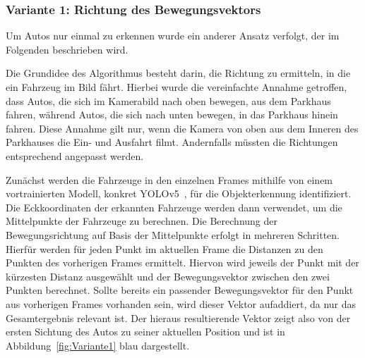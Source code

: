 \subsubsection{Variante 1: Richtung des Bewegungsvektors}\label{ch:Sensor_v1}

Um Autos nur einmal zu erkennen wurde ein anderer Ansatz verfolgt, der im Folgenden beschrieben wird.

Die Grundidee des Algorithmus besteht darin, die Richtung zu ermitteln, in die ein Fahrzeug im Bild fährt.
Hierbei wurde die vereinfachte Annahme getroffen, dass Autos, die sich im Kamerabild nach oben bewegen, aus dem Parkhaus fahren, während Autos, die sich nach unten bewegen, in das Parkhaus hinein fahren.
Diese Annahme gilt nur, wenn die Kamera von oben aus dem Inneren des Parkhauses die Ein- und Ausfahrt filmt.
Andernfalls müssten die Richtungen entsprechend angepasst werden.

Zunächst werden die Fahrzeuge in den einzelnen Frames mithilfe von einem vortrainierten Modell, konkret YOLOv5~\cite{yolov5}, für die Objekterkennung identifiziert.
Die Eckkoordinaten der erkannten Fahrzeuge werden dann verwendet, um die Mittelpunkte der Fahrzeuge zu berechnen.
Die Berechnung der Bewegungsrichtung auf Basis der Mittelpunkte erfolgt in mehreren Schritten.
Hierfür werden für jeden Punkt im aktuellen Frame die Distanzen zu den Punkten des vorherigen Frames ermittelt.
Hiervon wird jeweils der Punkt mit der kürzesten Distanz ausgewählt und der Bewegungsvektor zwischen den zwei Punkten berechnet.
Sollte bereits ein passender Bewegungsvektor für den Punkt aus vorherigen Frames vorhanden sein, wird dieser Vektor aufaddiert, da nur das Gesamtergebnis relevant ist.
Der hieraus resultierende Vektor zeigt also von der ersten Sichtung des Autos zu seiner aktuellen Position und ist in Abbildung~\ref{fig:Variante1} blau dargestellt.

